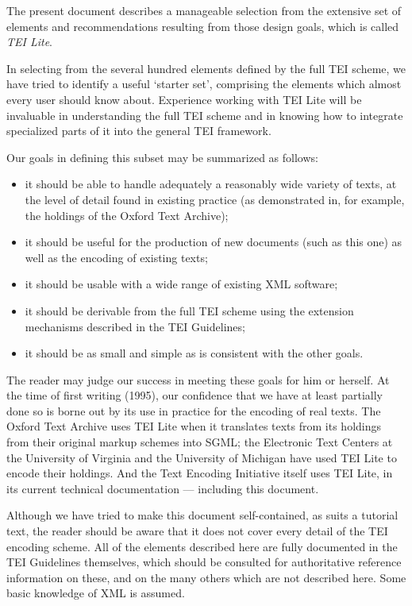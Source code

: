 \documentclass[11pt,twoside]{article}\makeatletter
\begin{document}
The present document describes a manageable selection from the extensive set of elements and recommendations resulting from those design goals, which is called \textit{TEI Lite}.\par
In selecting from the several hundred elements defined by the full TEI scheme, we have tried to identify a useful ‘starter set’, comprising the elements which almost every user should know about. Experience working with TEI Lite will be invaluable in understanding the full TEI scheme and in knowing how to integrate specialized parts of it into the general TEI framework.\par
Our goals in defining this subset may be summarized as follows: \begin{itemize}
\item it should be able to handle adequately a reasonably wide variety of texts, at the level of detail found in existing practice (as demonstrated in, for example, the holdings of the Oxford Text Archive);
\item it should be useful for the production of new documents (such as this one) as well as the encoding of existing texts;
\item it should be usable with a wide range of existing XML software;
\item it should be derivable from the full TEI scheme using the extension mechanisms described in the TEI Guidelines;
\item it should be as small and simple as is consistent with the other goals.
\end{itemize} \par
The reader may judge our success in meeting these goals for him or herself. At the time of first writing (1995), our confidence that we have at least partially done so is borne out by its use in practice for the encoding of real texts. The Oxford Text Archive uses TEI Lite when it translates texts from its holdings from their original markup schemes into SGML; the Electronic Text Centers at the University of Virginia and the University of Michigan have used TEI Lite to encode their holdings. And the Text Encoding Initiative itself uses TEI Lite, in its current technical documentation — including this document. \par
Although we have tried to make this document self-contained, as suits a tutorial text, the reader should be aware that it does not cover every detail of the TEI encoding scheme. All of the elements described here are fully documented in the TEI Guidelines themselves, which should be consulted for authoritative reference information on these, and on the many others which are not described here. Some basic knowledge of XML is assumed.
\end{document}
